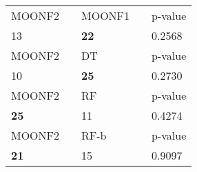 \begin{tabular}{ l l l l l}
\midrule
{MOONF2} & & {MOONF1} & & {p-value}\\
13 & & \textbf{22} & & 0.2568\\
\midrule
{MOONF2} & & {DT} & & {p-value}\\
10 & & \textbf{25} & & 0.2730\\
\midrule
{MOONF2} & & {RF} & & {p-value}\\
\textbf{25} & & 11 & & 0.4274\\
\midrule
{MOONF2} & & {RF-b} & & {p-value}\\
\textbf{21} & & 15 & & 0.9097\\
\midrule
\end{tabular}
